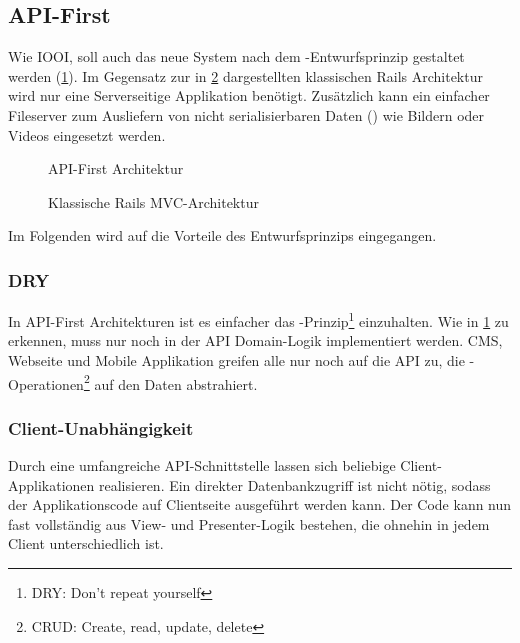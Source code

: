 \subsection{API-First}
\label{ssec:ea_api_first}

Wie IOOI, soll auch das neue System nach dem
-Entwurfsprinzip \cite{api-first} gestaltet werden
(\cref{fig:api_first_architektur}).  Im Gegensatz zur in
\cref{fig:klassische_rails_architektur} dargestellten klassischen Rails
Architektur wird nur eine Serverseitige Applikation benötigt.  Zusätzlich kann
ein einfacher Fileserver zum Ausliefern von nicht serialisierbaren Daten
() wie Bildern oder Videos eingesetzt werden.

\begin{figure}[h]
	\centering
	
	\caption{API-First Architektur}
	\label{fig:api_first_architektur}
\end{figure}

\begin{figure}[h]
	\centering
	
	\caption{Klassische Rails MVC-Architektur}
	\label{fig:klassische_rails_architektur}
\end{figure}

Im Folgenden wird auf die Vorteile des Entwurfsprinzips eingegangen.

\subsubsection{DRY}
\label{sssec:eaa_dry}

In API-First Architekturen ist es einfacher das
-Prinzip\footnote{DRY: Don't repeat yourself} einzuhalten.  Wie
in \cref{fig:api_first_architektur} zu erkennen, muss nur noch in der
API Domain-Logik implementiert werden.  CMS, Webseite und Mobile Applikation
greifen alle nur noch auf die API zu, die
-Operationen\footnote{CRUD: Create, read, update,
delete} auf den Daten abstrahiert.

\subsubsection{Client-Unabhängigkeit}
\label{sssec:eaa_client_unabhaengigkeit}

Durch eine umfangreiche API-Schnittstelle lassen sich beliebige
Client-Applikationen realisieren.  Ein direkter Datenbankzugriff ist nicht
nötig, sodass der Applikationscode auf Clientseite ausgeführt werden kann.  Der
Code kann nun fast vollständig aus View- und Presenter-Logik bestehen, die
ohnehin in jedem Client unterschiedlich ist.

